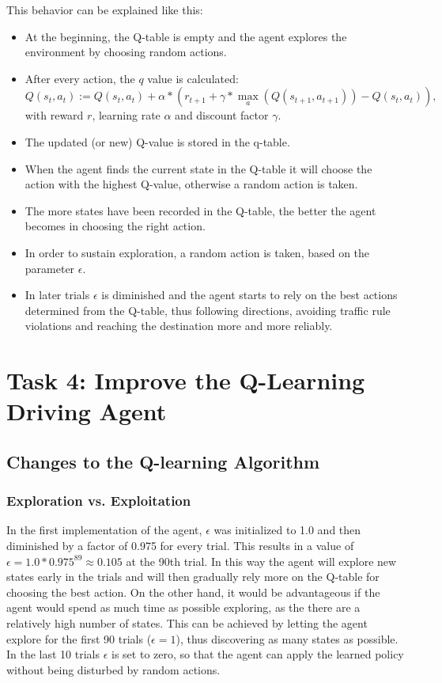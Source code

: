 \documentclass[11pt]{article}
\begin{document}
This behavior can be explained like this:
\begin{itemize}
    \item At the beginning, the Q-table is empty and the agent explores the environment by choosing random actions.
    \item After every action, the $q$ value is calculated:
      \begin{equation}
          Q(s_t,a_t) :=  Q(s_t,a_t) + \alpha * (r_{t+1} + \gamma * \max\limits_a(Q(s_{t+1},a_{t+1})) - Q(s_t,a_t)),
      \end{equation} 
      with reward $r$, learning rate $\alpha$ and discount factor $\gamma$.
    \item The updated (or new) Q-value is stored in the q-table.
    \item When the agent finds the current state in the Q-table it will choose the action with the highest Q-value, otherwise a random action is taken.
    \item The more states have been recorded in the Q-table, the better the agent becomes in choosing the right action.
    \item In order to sustain exploration, a random action is taken, based on the parameter $\epsilon$.
    \item In later trials $\epsilon$ is diminished and the agent starts to rely on the best actions determined from the Q-table, thus following directions, avoiding 
    traffic rule violations and reaching the destination more and more reliably.
\end{itemize}

\section*{Task 4: Improve the Q-Learning Driving Agent}
\setcounter{section}{4} 
\subsection{Changes to the Q-learning Algorithm}

\subsubsection{Exploration vs. Exploitation}
In the first implementation of the agent, $\epsilon$ was initialized to 1.0 and then diminished by a factor of 0.975 for every trial. This results in a value of $\epsilon = 1.0 * 0.975^{89} \approx 0.105$ at the 90th trial. In this way the agent will explore new states early 
in the trials and will then gradually rely more on the Q-table for choosing the best action. On the other hand, it would be advantageous if the agent would spend as much time as possible exploring, as the there are a relatively high number of states. This can be achieved by letting the agent explore for the first 90 trials ($\epsilon = 1$), thus discovering as many states as possible. In the last 10 trials $\epsilon$ is set to zero, so that the agent can apply the learned policy without being disturbed by random actions.
\end{document}
